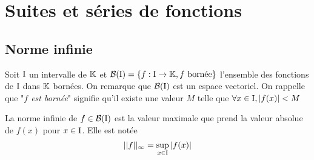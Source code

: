 \chapter{Suites et séries de fonctions}
\section{Norme infinie}
Soit $\text{I}$ un intervalle de $\mathbb{K}$ et $\mathcal{B}(\text{I}) = \{f:\text{I}\to\mathbb{K},f\text{ bornée}\}$ l'ensemble des fonctions de $\text{I}$ dans $\mathbb{K}$ bornées. On remarque que $\mathcal{B}(\text{I})$ est un espace vectoriel. On rappelle que "\textit{$f$ est bornée}" signifie qu'il existe une valeur $M$ telle que $\forall x\in\text{I}, |f(x)| < M$

\begin{defi}
	La norme infinie de $f\in\mathcal{B}(\text{I})$ est la valeur maximale que prend la valeur absolue de $f(x)$ pour $x\in\text{I}$. Elle est notée
	$$||f||_\infty=\sup\limits_{x\in\text{I}}|f(x)|$$
\end{defi}
